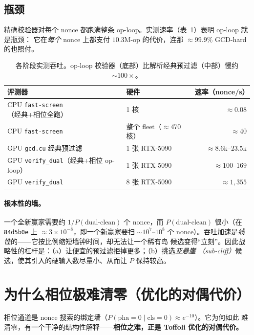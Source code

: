 \documentclass[11pt]{ctexart}
\let\c\lstinline
\begin{document}
\subsection{瓶颈}
精确校验器对每个 nonce 都跑满整条 op-loop。实测速率（表~\ref{tab:rates}）表明 op-loop 就是瓶颈：
它在\emph{每个} nonce 上都支付 $10.3$M-op 的代价，连那 $\approx 99.9\%$ GCD-hard 的也照付。

\begin{table}[h]\centering
\begin{tabular}{@{}llr@{}}
\toprule
评测器 & 硬件 & 速率（nonce/s） \\ \midrule
CPU \c{fast-screen}（经典+相位全跑） & 1 核 & $\approx 0.08$ \\
CPU \c{fast-screen} & 整个 fleet（$\approx$470 核） & $\approx 40$ \\
GPU \c{gcd.cu} 经典预过滤 & 1 张 RTX-5090 & $\approx 8.6$k--$23.5$k \\
GPU \c{verify_dual}（经典+相位 op-loop） & 1 张 RTX-5090 & $\approx 100$--$169$ \\
GPU \c{verify_dual} & 8 张 RTX-5090 & $\approx 1{,}355$ \\ \bottomrule
\end{tabular}
\caption{各阶段实测吞吐。op-loop 校验器（底部）比解析经典预过滤（中部）慢约 $\sim 100\times$。}
\label{tab:rates}
\end{table}

\paragraph{根本性的墙。}一个全新赢家需要约 $1/P(\text{dual-clean})$ 个 nonce，而
$P(\text{dual-clean})$ 很小（在 \texttt{84d5b0e} 上 $\approx 3\times10^{-8}$，即一个新赢家要扫
$\sim 10^7$--$10^8$ 个 nonce）。吞吐加速是\emph{线性}的——它按比例缩短墙钟时间，却无法让一个稀有岛
候选变得``立刻''。因此战略性的杠杆是：（a）让便宜的预过滤拒掉更多；（b）挑选\emph{亚悬崖
（sub-cliff）}候选，使其引入的硬输入数尽量小、从而让 $P$ 保持较高。

\section{为什么相位极难清零（优化的对偶代价）}
\label{sec:whyphase}
相位通道是 nonce 搜索的绑定墙（$P(\text{pha}{=}0\mid\text{cls}{=}0)\approx e^{-10}$）。它为何如此
难清零，有一个干净的结构性解释——\textbf{相位之难，正是 Toffoli 优化的对偶代价。}
\end{document}
